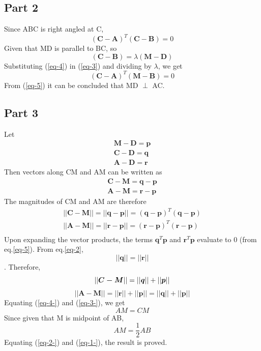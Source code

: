 \documentclass[journal,10pt,twocolumn]{article}
\begin{document}
\subsection*{Part 2}
Since ABC is right angled at C,
\begin{equation}
(\boldsymbol{C-A})^T(\boldsymbol{C-B}) = 0	
\label{eq-3}
\end{equation}
Given that MD is parallel to BC, so
\begin{equation}
(\boldsymbol{C-B}) = \lambda(\boldsymbol{M-D})
\label{eq-4}
\end{equation}
Substituting (\ref{eq-4}) in (\ref{eq-3}) and dividing by $\lambda$, we get
\begin{equation}
(\boldsymbol{C-A})^T(\boldsymbol{M-B}) = 0	
\label{eq-5}
\end{equation}
From (\ref{eq-5}) it can be concluded that MD $\perp$ AC.

\subsection*{Part 3}
Let
\begin{eqnarray}
	\boldsymbol{M-D} = \boldsymbol{p}\\
	\boldsymbol{C-D} = \boldsymbol{q}\\
	\boldsymbol{A-D} = \boldsymbol{r}
\end{eqnarray}
Then vectors along CM and AM can be written as
\begin{eqnarray}
	\boldsymbol{C-M} = \boldsymbol{q-p}\\
	\boldsymbol{A-M} = \boldsymbol{r-p}
\end{eqnarray}
The magnitudes of CM and AM are therefore
\begin{eqnarray}
	||\boldsymbol{C-M}|| = ||\boldsymbol{q-p}|| = (\boldsymbol{q-p})^T(\boldsymbol{q-p})\\
	||\boldsymbol{A-M}|| = ||\boldsymbol{r-p}|| = (\boldsymbol{r-p})^T(\boldsymbol{r-p})\\
\end{eqnarray}
Upon expanding the vector products, the terms $\boldsymbol{q}^T\boldsymbol{p}$ and $\boldsymbol{r}^T\boldsymbol{p}$ evaluate to 0 (from eq.\ref{eq-5}). From eq.\ref{eq-2}, $$||\boldsymbol{q}|| = ||\boldsymbol{r}||$$. Therefore,
\begin{equation}
||\boldsymbol{C-M}|| = ||\boldsymbol{q}|| + ||\boldsymbol{p}||\\
\label{eq-4-}
\end{equation}
\begin{equation}
||\boldsymbol{A-M}|| = ||\boldsymbol{r}|| + ||\boldsymbol{p}|| = ||\boldsymbol{q}|| + ||\boldsymbol{p}||
\label{eq-3-}
\end{equation}
Equating (\ref{eq-4-}) and (\ref{eq-3-}), we get
\begin{equation}
AM = CM
\label{eq-2-}
\end{equation}
Since given that M is midpoint of AB, 
\begin{equation}
AM = \frac{1}{2}AB
\label{eq-1-}
\end{equation}
Equating (\ref{eq-2-}) and (\ref{eq-1-}), the result is proved.
\end{document}
